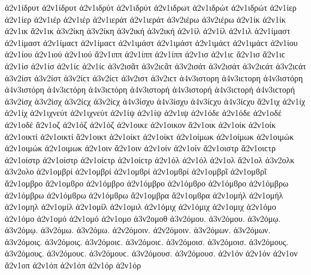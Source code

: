 {ἀ2ν1ίδρυτ ἀ2ν1ίδρυτ   %
ἀ2ν1ιδρύτ ἀ2ν1ιδρύτ
ἀ2ν1ιδρωτ   %
ἀ2ν1ιδρώτ ἀ2ν1ιδρώτ   %
ἀ2ν1ίερ ἀ2ν1ίερ   %
ἀ2ν1ιέρ ἀ2ν1ιέρ
ἀ2ν1ιεράτ ἀ2ν1ιεράτ   %
ἀ3ν2ιέρω ἀ3ν2ιέρω   %
ἀ2ν1ίκ ἀ2ν1ίκ   %
ἀ2ν1ικ
ἄ2ν1ικ   %
ἀ3ν2ίκη ἀ3ν2ίκη   %
ἀ3ν2ική ἀ3ν2ική
ἀ2ν1ίλ ἀ2ν1ίλ   %
ἀ2ν1ιλ
ἀ2ν1ίμαστ ἀ2ν1ίμαστ ἀ2ν1ίμαϲτ ἀ2ν1ίμαϲτ   %
ἀ2ν1ιμάστ ἀ2ν1ιμάστ ἀ2ν1ιμάϲτ ἀ2ν1ιμάϲτ
ἀ2ν1ίου ἀ2ν1ίου   %
ἀ2ν1ιού ἀ2ν1ιού
ἄ2ν1ιππ   %
ἀ2ν1ίππ ἀ2ν1ίππ
ἀ2ν1ισ ἀ2ν1ιϲ   %
ἄ2ν1ισ ἄ2ν1ιϲ   %
ἀ2ν1ίσ ἀ2ν1ίσ ἀ2ν1ίϲ ἀ2ν1ίϲ
ἀ3ν2ισᾶτ ἀ3ν2ιϲᾶτ   %
ἀ3ν2ισάτ ἀ3ν2ισάτ ἀ3ν2ιϲάτ ἀ3ν2ιϲάτ
ἀ3ν2ίστ ἀ3ν2ίστ ἀ3ν2ίϲτ ἀ3ν2ίϲτ   %
ἀ3ν2ιστ ἀ3ν2ιϲτ
ἀ4ν3ιστορη ἀ4ν3ιϲτορη   %
ἀ4ν3ιστόρη ἀ4ν3ιστόρη ἀ4ν3ιϲτόρη ἀ4ν3ιϲτόρη   %
ἀ4ν3ιστορή ἀ4ν3ιστορή ἀ4ν3ιϲτορή ἀ4ν3ιϲτορή
ἀ3ν2ίσχ ἀ3ν2ίσχ ἀ3ν2ίϲχ ἀ3ν2ίϲχ   %
ἀ4ν3ίσχυ ἀ4ν3ίσχυ ἀ4ν3ίϲχυ ἀ4ν3ίϲχυ   %
ἄ2ν1ιχ   %
ἀ2ν1ίχ ἀ2ν1ίχ
ἀ2ν1ιχνεύτ ἀ2ν1ιχνεύτ   %
ἀ2ν1ίψ ἀ2ν1ίψ   %
ἀ2ν1ιψ
ἀ2ν1όδε ἀ2ν1όδε   %
ἀ2ν1οδέ ἀ2ν1οδέ
ἄ2ν1οζ   %
ἀ2ν1όζ ἀ2ν1όζ
ἀ2ν1οικε   %
ἀ2ν1οικον   %
ἄ2ν1οικ   %
ἀ2ν1οίκ ἀ2ν1οίκ
ἀ2ν1οικτί ἀ2ν1οικτί   %
ἄ2ν1οικτ   %
ἀ2ν1οίκτ ἀ2ν1οίκτ
ἀ2ν1οίμωκ ἀ2ν1οίμωκ   %
ἀ2ν1οιμώκ ἀ2ν1οιμώκ
ἀ2ν1οιμωκ   %
ἀ2ν1οιν   %
ἄ2ν1οιν   %
ἀ2ν1οίν ἀ2ν1οίν
ἄ2ν1οιστρ ἄ2ν1οιϲτρ   %
ἀ2ν1οίστρ ἀ2ν1οίστρ ἀ2ν1οίϲτρ ἀ2ν1οίϲτρ
ἀ2ν1όλ ἀ2ν1όλ   %
ἀ2ν1ολ
ἄ2ν1ολ   %
ἀ3ν2ολκ   %
ἀ3ν2ολο   %
ἀ2ν1ομβρί ἀ2ν1ομβρί ἀ2ν1ομϐρί ἀ2ν1ομϐρί %
ἀ2ν1ομβρῖ ἀ2ν1ομϐρῖ
ἄ2ν1ομβρο ἄ2ν1ομϐρο %
ἀ2ν1όμβρο ἀ2ν1όμβρο ἀ2ν1όμϐρο ἀ2ν1όμϐρο
ἀ2ν1όμβρω ἀ2ν1όμβρω ἀ2ν1όμϐρω ἀ2ν1όμϐρω
ἄ2ν1ομβρα ἄ2ν1ομϐρα
ἀ2ν1ομήλ ἀ2ν1ομήλ   %
ἀ2ν1ομηλ
ἀ2ν1ομίλ ἀ2ν1ομίλ   %
ἀ2ν1ομιλ
ἀ2ν1όμιχ ἀ2ν1όμιχ   %
ἀ2ν1ομιχ
ἀ2ν1όμο ἀ2ν1όμο   %
ἀ2ν1ομό ἀ2ν1ομό
ἀ2ν1ομο   %
ἀ3ν2ομοθ   %
ἀ3ν2όμου. ἀ3ν2όμου.   %
ἀ3ν2όμῳ. ἀ3ν2όμῳ.
ἀ3ν2όμω. ἀ3ν2όμω.
ἀ2ν2όμοιν. ἀ2ν2όμοιν.
ἀ3ν2όμων. ἀ3ν2όμων.
ἀ3ν2όμοις. ἀ3ν2όμοις. ἀ3ν2όμοιϲ. ἀ3ν2όμοιϲ.
ἀ3ν2όμοισ. ἀ3ν2όμοισ.
ἀ3ν2όμους. ἀ3ν2όμους. ἀ3ν2όμουϲ. ἀ3ν2όμουϲ.
ἀ3ν2όμουσ. ἀ3ν2όμουσ.
ἀ2ν1όν ἀ2ν1όν   %
ἀ2ν1ον
ἄ2ν1οπ   %
ἀ2ν1όπ ἀ2ν1όπ
ἀ2ν1όρ ἀ2ν1όρ   %
}
